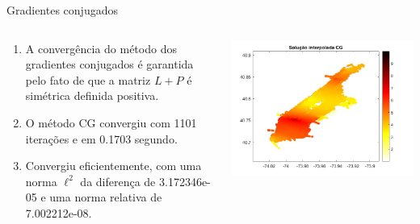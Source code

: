 \documentclass{beamer} %
\theoremstyle{definition}
\begin{document}
    \begin{frame}{Gradientes conjugados}
        \pause
        \begin{columns}
            \begin{column}{0.5\textwidth}            
                \begin{enumerate}
                    \item A convergência do método dos gradientes conjugados é garantida pelo fato de que a matriz  $L + P$ é simétrica definida positiva.
                    \pause
                    \item  O método CG convergiu com 1101 iterações e em 0.1703 segundo.
                    \pause
                    \item Convergiu eficientemente, com uma norma $\mathcal{\ell}^2$ da diferença de 3.172346e-05 e uma norma relativa de 7.002212e-08.
                    \pause
                \end{enumerate}
            \end{column}
            \begin{column}{0.5\textwidth}
                \centering
                \includegraphics[width=\textwidth]{CGinterpol.jpeg}
            \end{column}
        \end{columns}
    \end{frame}
\end{document}
